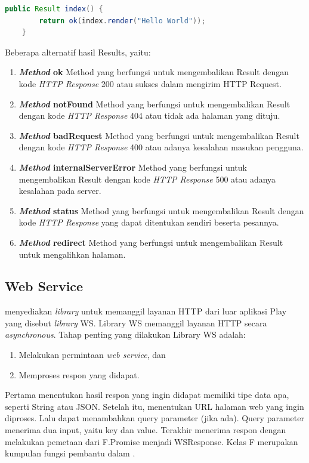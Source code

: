 \begin{lstlisting}[caption=Contoh Controller,label = {lst_2_controller},language=Java]
	public Result index() {
        return ok(index.render("Hello World"));
    }
\end{lstlisting}

Beberapa alternatif hasil Results, yaitu:
\begin{enumerate}
	\item \textbf{\textit{Method} ok} 
	Method yang berfungsi untuk mengembalikan Result dengan kode \textit{HTTP Response} 200 atau sukses dalam mengirim HTTP Request.
	\item \textbf{\textit{Method} notFound} 
	Method yang berfungsi untuk mengembalikan Result dengan  kode \textit{HTTP Response} 404 atau tidak ada halaman yang dituju.
	\item \textbf{\textit{Method} badRequest} 
	Method yang berfungsi untuk mengembalikan Result dengan kode \textit{HTTP Response} 400 atau adanya kesalahan masukan pengguna.
	\item \textbf{\textit{Method} internalServerError}
	Method yang berfungsi untuk mengembalikan Result dengan kode \textit{HTTP Response} 500 atau adanya kesalahan pada server.
	\item \textbf{\textit{Method} status}
	Method yang berfungsi untuk mengembalikan Result dengan kode \textit{HTTP Response} yang dapat ditentukan sendiri beserta pesannya.
	\item \textbf{\textit{Method} redirect}
	Method yang berfungsi untuk mengembalikan Result untuk mengalihkan halaman.
\end{enumerate}

\subsection{Web Service}
\play menyediakan \textit{library} untuk memanggil layanan HTTP dari luar aplikasi Play yang disebut \textit{library} WS. Library WS memanggil layanan HTTP secara \textit{asynchronous}. Tahap penting yang dilakukan Library WS adalah:
\begin{enumerate}
	\item Melakukan permintaan \textit{web service}, dan
	\item Memproses respon yang didapat.
\end{enumerate}

Pertama menentukan hasil respon yang ingin didapat memiliki tipe data apa, seperti String atau JSON. Setelah itu, menentukan URL halaman web yang ingin diproses. Lalu dapat menambahkan query parameter (jika ada). Query parameter menerima dua input, yaitu key dan value. Terakhir menerima respon dengan melakukan pemetaan dari F.Promise menjadi WSResponse. Kelas F merupakan kumpulan fungsi pembantu dalam \play.

